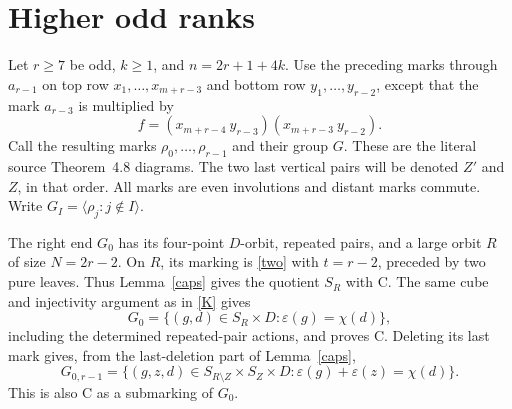 \documentclass[11pt]{article}
\newcommand{\gen}[1]{\langle#1\rangle}
\newcommand{\eps}{\varepsilon}
\begin{document}
\section{Higher odd ranks}
Let $r\ge7$ be odd, $k\ge1$, and $n=2r+1+4k$. Use the preceding
marks through $a_{r-1}$ on top row
$x_1,\ldots,x_{m+r-3}$ and bottom row $y_1,\ldots,y_{r-2}$,
except that the mark $a_{r-3}$ is multiplied by
\begin{equation}\label{vertical2}
 f=(x_{m+r-4}\ y_{r-3})(x_{m+r-3}\ y_{r-2}).
\end{equation}
Call the resulting marks $\rho_0,\ldots,\rho_{r-1}$ and their
group $G$. These are the literal source Theorem~4.8 diagrams.
The two last vertical pairs will be denoted $Z'$ and $Z$, in
that order. All marks are even involutions and distant marks
commute. Write $G_I=\gen{\rho_j:j\notin I}$.

The right end $G_0$ has its four-point $D$-orbit, repeated pairs,
and a large orbit $R$ of size $N=2r-2$. On $R$, its marking is
\eqref{two} with $t=r-2$, preceded by two pure leaves. Thus
Lemma~\ref{caps} gives the quotient $S_R$ with C. The same
cube and injectivity argument as in \eqref{K} gives
\begin{equation}\label{G0odd}
 G_0=\{(g,d)\in S_R\times D:\eps(g)=\chi(d)\},
\end{equation}
including the determined repeated-pair actions, and proves C.
Deleting its last mark gives, from the last-deletion part of
Lemma~\ref{caps},
\begin{equation}\label{middleodd}
 G_{0,r-1}=
 \{(g,z,d)\in S_{R\setminus Z}\times S_Z\times D:
                  \eps(g)+\eps(z)=\chi(d)\}.
\end{equation}
This is also C as a submarking of $G_0$.
\end{document}
